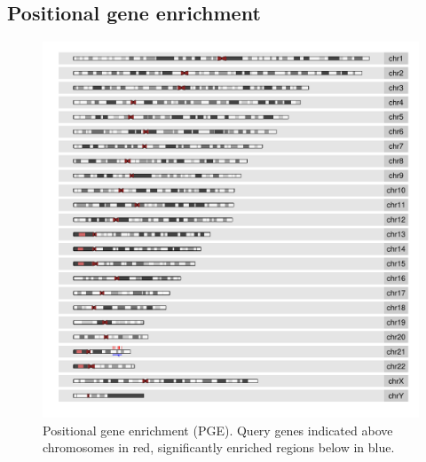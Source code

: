\subsection{Positional gene enrichment}
\begin{figure}[!ht]
\begin{center}
\includegraphics{ideogram_component.pdf}
\end{center}
\caption{Positional gene enrichment (PGE). Query genes indicated above chromosomes in red, significantly enriched regions below in blue.}
\end{figure}
